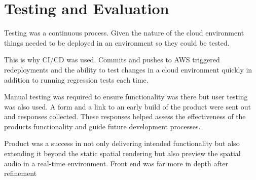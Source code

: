 \thispagestyle{plain}
\newpage
\section{Testing and Evaluation}\label{sec:testing-and-evaluation}

\normalsize

Testing was a continuous process. Given the nature of the cloud environment things needed to be deployed in an environment so they could be tested.

This is why CI/CD was used.
Commits and pushes to AWS
triggered redeployments and the ability
to test changes in a cloud environment quickly in addition to running regression tests each time.

Manual testing was required to ensure functionality was there but user testing was also used.
A form and a link to an early build of the product were sent out and responses collected. These responses helped assess the effectiveness of the products functionality and guide future development processes.

Product was a success in not only delivering intended functionality but also extending it beyond the static spatial rendering but also preview the spatial audio in a real-time environment.
Front end was far more in depth after refinement